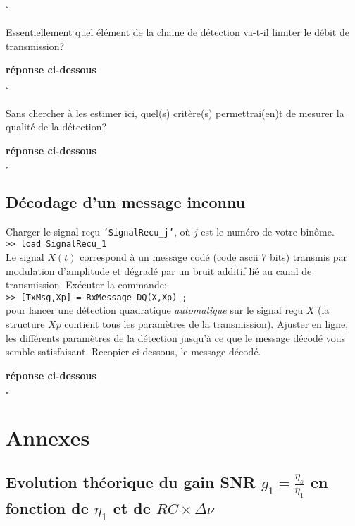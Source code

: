 \documentclass{article}
\newcommand{\debutrep}[1]{\color{blue}\begin{center} \hrulefill \textbf{ #1 } \hrulefill \end{center} }
\newcommand{\finrep}{\vspace*{5mm}\hfill $\square$\color{black}\vspace*{5mm}}
\begin{document}
\finrep

\subsubsection{}

Essentiellement quel élément de la chaine de détection va-t-il limiter le débit de transmission?

\debutrep{réponse ci-dessous}

\finrep

\subsubsection{}
Sans chercher à les estimer ici, quel(s) critère(s) permettrai(en)t de mesurer la qualité de la détection?

\debutrep{réponse ci-dessous}

\finrep


\subsection{Décodage d'un message inconnu}


Charger le signal reçu {\tt 'SignalRecu\_j'}, où $j$ est le numéro de votre binôme.\\[2mm]
{\tt >\!> load SignalRecu\_1}\\[2mm]
Le signal $X(t)$ correspond à un message codé (code ascii 7 bits) transmis par modulation d'amplitude et  dégradé par un bruit additif lié au canal de transmission. 
Exécuter  la  commande: \\[2mm]
{\tt >\!> [TxMsg,Xp] = RxMessage\_DQ(X,Xp) ; }  \\[2mm]
pour lancer une détection quadratique {\em automatique} sur le signal reçu $X$ (la structure $Xp$ contient tous les paramètres de la transmission).
Ajuster en ligne, les différents paramètres de la détection jusqu'à ce que le message décodé vous semble satisfaisant. Recopier ci-dessous, le message décodé. 

\debutrep{réponse ci-dessous}

\finrep


\section{Annexes}

\subsection{Evolution théorique du gain SNR ${\displaystyle g_1=\frac{\eta_s}{\eta_1}}$ en fonction de $\eta_1$ et de $RC \times \Delta\nu$}
\end{document}
